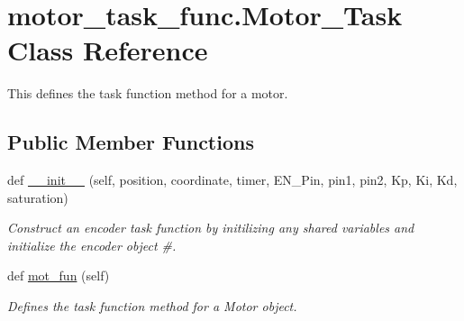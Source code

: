 \hypertarget{classmotor__task__func_1_1Motor__Task}{}\section{motor\+\_\+task\+\_\+func.\+Motor\+\_\+\+Task Class Reference}
\label{classmotor__task__func_1_1Motor__Task}


This defines the task function method for a motor.  


\subsection*{Public Member Functions}
\begin{DoxyCompactItemize}
\item 
def \hyperlink{classmotor__task__func_1_1Motor__Task_add76e1a811f52794af8457d3168848a4}{\+\_\+\+\_\+init\+\_\+\+\_\+} (self, position, coordinate, timer, E\+N\+\_\+\+Pin, pin1, pin2, Kp, Ki, Kd, saturation)
\begin{DoxyCompactList}\small\item\em Construct an encoder task function by initilizing any shared variables and initialize the encoder object \#. \end{DoxyCompactList}\item 
def \hyperlink{classmotor__task__func_1_1Motor__Task_aa3835e11e339baa7d4307cbb880c3592}{mot\+\_\+fun} (self)\hypertarget{classmotor__task__func_1_1Motor__Task_aa3835e11e339baa7d4307cbb880c3592}{}\label{classmotor__task__func_1_1Motor__Task_aa3835e11e339baa7d4307cbb880c3592}

\begin{DoxyCompactList}\small\item\em Defines the task function method for a Motor object. \end{DoxyCompactList}\end{DoxyCompactItemize}
